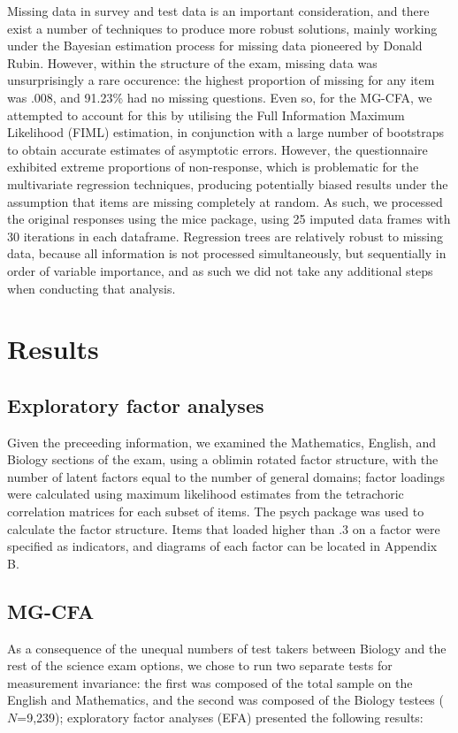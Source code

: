 \documentclass{article}\usepackage[]{graphicx}\usepackage[]{color}
\begin{document}
Missing data in survey and test data is an important consideration, and there exist a number of techniques to produce more robust solutions, mainly working under the Bayesian estimation process for missing data pioneered by Donald Rubin\cite{rubin}. However, within the structure of the exam, missing data was unsurprisingly a rare occurence: the highest proportion of missing for any item was .008, and 91.23\% had no missing questions. Even so, for the MG-CFA, we attempted to account for this by utilising the Full Information Maximum Likelihood (FIML) estimation, in conjunction with a large number of bootstraps to obtain accurate estimates of asymptotic errors. However, the questionnaire exhibited extreme proportions of non-response, which is problematic for the multivariate regression techniques, producing potentially biased results under the assumption that items are missing completely at random. As such, we processed the original responses using the mice package\cite{mice}, using 25 imputed data frames with 30 iterations in each dataframe. Regression trees are relatively robust to missing data, because all information is not processed simultaneously, but sequentially in order of variable importance, and as such we did not take any additional steps when conducting that analysis.
\section{Results}
\subsection{Exploratory factor analyses}
Given the preceeding information, we examined the Mathematics, English, and Biology sections of the exam, using a oblimin rotated factor structure, with the number of latent factors equal to the number of general domains; factor loadings were calculated using maximum likelihood estimates from the tetrachoric correlation matrices for each subset of items. The psych package was used to calculate the factor structure. Items that loaded higher than .3 on a factor were specified as indicators, and diagrams of each factor can be located in Appendix B.
\subsection{MG-CFA}
As a consequence of the unequal numbers of test takers between Biology and the rest of the science exam options, we chose to run two separate tests for measurement invariance: the first was composed of the total sample on the English and Mathematics, and the second was composed of the Biology testees ($N$=9,239); exploratory factor analyses (EFA) presented the following results:
\end{document}
